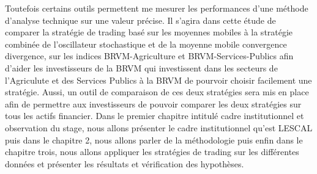 \par{
    Toutefois certains outils permettent me mesurer les performances d'une 
    méthode d'analyse technique sur une valeur précise. 
    Il s'agira dans cette étude de comparer la stratégie de trading basé 
    sur les moyennes mobiles à la stratégie combinée de l'oscillateur 
    stochastique et de la moyenne mobile convergence divergence, sur les 
    indices BRVM-Agriculture et BRVM-Services-Publics afin d'aider les 
    investisseurs de la BRVM qui investissent dans les secteurs de 
    l'Agriculute et des Services Publics à la BRVM de pourvoir choisir 
    facilement une stratégie. Aussi, un outil de comparaison de ces deux 
    stratégies sera mis en place afin de permettre aux investisseurs de 
    pouvoir comparer les deux stratégies sur tous les actifs financier.
    Dans le premier chapitre intitulé cadre institutionnel et observation 
    du stage, nous allons présenter le cadre institutionnel qu'est LESCAL 
    puis dans le chapitre 2, nous allons parler de la méthodologie puis 
    enfin dans le chapitre trois, nous allons appliquer les stratégies de 
    trading sur les différentes données et présenter les résultats et 
    vérification des hypothèses.
}
